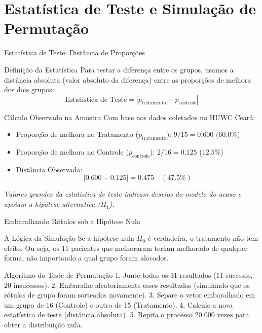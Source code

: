 \section{Estatística de Teste e Simulação de Permutação}

\begin{frame}{Estatística de Teste: Distância de Proporções}
    \begin{block}{Definição da Estatística}
        Para testar a diferença entre os grupos, usamos a distância absoluta (valor absoluto da diferença) entre as proporções de melhora dos dois grupos:
        $$\text{Estatística de Teste} = |p_{\text{tratamento}} - p_{\text{controle}}|$$
    \end{block}
    \begin{block}{Cálculo Observado na Amostra}
        Com base nos dados coletados no HUWC Ceará:
        \begin{itemize}
            \item Proporção de melhora no Tratamento ($p_{\text{tratamento}}$): $9/15 = 0.600$ ($60.0\%$)
            \item Proporção de melhora no Controle ($p_{\text{controle}}$): $2/16 = 0.125$ ($12.5\%$)
            \item Distância Observada:
                $$|0.600 - 0.125| = 0.475 \quad (47.5\%)$$
        \end{itemize}
    \end{block}
    \centering
    \textit{Valores grandes da estatística de teste indicam desvios do modelo do acaso e apoiam a hipótese alternativa ($H_1$).}
\end{frame}

\begin{frame}{Embaralhando Rótulos sob a Hipótese Nula}
    \begin{block}{A Lógica da Simulação}
        Se a hipótese nula $H_0$ é verdadeira, o tratamento não tem efeito. Ou seja, os $11$ pacientes que melhoraram teriam melhorado de qualquer forma, não importando a qual grupo foram alocados.
    \end{block}
    \begin{block}{Algoritmo do Teste de Permutação}
        1. Junte todos os $31$ resultados ($11$ sucessos, $20$ insucessos).
        2. Embaralhe aleatoriamente esses resultados (simulando que os rótulos de grupo foram sorteados novamente).
        3. Separe o vetor embaralhado em um grupo de 16 (Controle) e outro de 15 (Tratamento).
        4. Calcule a nova estatística de teste (distância absoluta).
        5. Repita o processo $20.000$ vezes para obter a distribuição nula.
    \end{block}
\end{frame}

